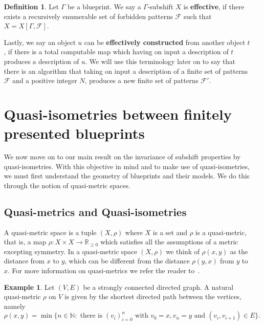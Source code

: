 \documentclass{article}
\theoremstyle{definition}
\newtheorem{defn}[theorem]{Definition} %
\newtheorem{example}[theorem]{Example} %
\theoremstyle{definition}
\newcommand{\NN}{\mathbb{N}}
\newcommand{\R}{\mathbb{R}}
\newcommand{\FF}{\mathcal{F}}
\newcommand{\define}[1]{\textbf{#1}}
\begin{document}
\begin{defn}
    Let $\Gamma$ be a blueprint. We say a $\Gamma$-subshift $X$ is \define{effective}, if there exists a recursively enumerable set of forbidden patterns $\mathcal{F}$ such that $X = X[\Gamma,\mathcal{F}]$. 
\end{defn}

Lastly, we say an object $u$ can be \define{effectively constructed} from another object $t$, if there is a total computable map which having on input a description of $t$ produces a description of $u$. We will use this terminology later on to say that there is an algorithm that taking on input a description of a finite set of patterns $\FF$ and a positive integer $N$, produces a new finite set of patterns $\FF'$.



%
\section{Quasi-isometries between finitely presented blueprints}
\label{sec:quasi-isometries}

We now move on to our main result on the invariance of subshift properties by quasi-isometries. With this objective in mind and to make use of quasi-isometries, we must first understand the geometry of blueprints and their models. We do this through the notion of quasi-metric spaces.

\subsection{Quasi-metrics and Quasi-isometries}

A quasi-metric space is a tuple $(X,\rho)$ where $X$ is a set and $\rho$ is a quasi-metric, that is, a map $\rho \colon X \times X \to \R_{\geq 0}$ which satisfies all the assumptions of a metric excepting symmetry. In a quasi-metric space $(X,\rho)$ we think of $\rho(x,y)$ as the distance from $x$ to $y$, which can be different from the distance $\rho(y,x)$ from $y$ to $x$. For more information on quasi-metrics we refer the reader to~\cite{kelly1963bitopological,wilson1931quasi}. 

\begin{example}
    Let $(V,E)$ be a strongly connected directed graph. A natural quasi-metric $\rho$ on $V$ is given by the shortest directed path between the vertices, namely \[\rho(x,y) = \min\{ n \in \NN: \mbox{ there is } (v_i)_{i=0}^n \mbox{ with } v_0 = x, v_n = y \mbox{ and } (v_i,v_{i+1})\in E \}.\]
\end{example}
\end{document}
